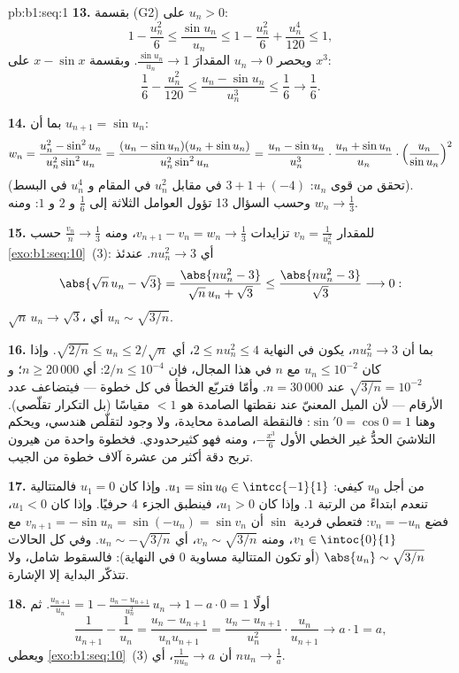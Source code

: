 \begin{solution}{pb:b1:seq:1}
\textbf{13.} بقسمة (G2) على $u_n > 0$:
\[
1 - \frac{u_n^2}{6} \leq \frac{\sin u_n}{u_n} \leq 1 -
\frac{u_n^2}{6} + \frac{u_n^4}{120} \leq 1 ,
\]
ويحصر $u_n \to 0$ المقدارَ $\frac{\sin u_n}{u_n} \to 1$. وبقسمة
$x - \sin x$ على $x^3$:
\[
\frac16 - \frac{u_n^2}{120} \leq \frac{u_n - \sin u_n}{u_n^3}
\leq \frac16 \longrightarrow \frac16 .
\]

\textbf{14.} بما أن $u_{n+1} = \sin u_n$:
\[
w_n = \frac{u_n^2 - \sin^2 u_n}{u_n^2 \sin^2 u_n}
= \frac{(u_n - \sin u_n)(u_n + \sin u_n)}{u_n^2 \sin^2 u_n}
= \frac{u_n - \sin u_n}{u_n^3}\cdot
\frac{u_n + \sin u_n}{u_n}\cdot
\Bigl(\frac{u_n}{\sin u_n}\Bigr)^{2}
\]
(تحقق من قوى $u_n$: $3 + 1 + (-4)$ في مقابل $u_n^2$
في المقام و $u_n^4$ في البسط). وحسب السؤال 13 تؤول العوامل
الثلاثة إلى $\frac16$ و $2$ و $1$: ومنه $w_n \to \frac13$.

\textbf{15.} للمقدار $v_n = \frac{1}{u_n^2}$ تزايدات $v_{n+1} -
v_n = w_n \to \frac13$، ومنه $\frac{v_n}{n} \to \frac13$ حسب
\cref{exo:b1:seq:10}~(3): أي $n u_n^2 \to 3$. عندئذ
\[
\abs{\sqrt n\,u_n - \sqrt 3}
= \frac{\abs{n u_n^2 - 3}}{\sqrt n\,u_n + \sqrt 3}
\leq \frac{\abs{n u_n^2 - 3}}{\sqrt 3} \longrightarrow 0 :
\]
$\sqrt n\,u_n \to \sqrt 3$، أي $u_n \sim \sqrt{3/n}$.

\textbf{16.} بما أن $n u_n^2 \to 3$، يكون في النهاية $2 \leq n u_n^2
\leq 4$، أي $\sqrt{2/n} \leq u_n \leq 2/\sqrt n$. وإذا كان $u_n
\leq 10^{-2}$ مع $n$ في هذا المجال، فإن $2/n \leq 10^{-4}$:
أي $n \geq 20\,000$؛ و $\sqrt{3/n} = 10^{-2}$ عند $n = 30\,000$.
وأمّا  فتربّع الخطأ في كل خطوة --- فيتضاعف
عدد الأرقام --- لأن الميل المعنيّ عند نقطتها الصامدة
هو $< 1$ مقياسًا (بل التكرار تقلّصي).
وهنا $\sin' 0 = \cos 0 = 1$: فالنقطة الصامدة محايدة، ولا وجود
لتقلّص هندسي، ويحكم التلاشيَ الحدُّ غير الخطي
الأول $-\frac{x^3}{6}$، ومنه فهو كثيرحدودي. فخطوة
واحدة من هيرون تربح دقة أكثر من عشرة آلاف خطوة من
الجيب.

\textbf{17.} من أجل $u_0$ كيفي: $u_1 = \sin u_0 \in
\intcc{-1}{1}$. وإذا كان $u_1 = 0$ فالمتتالية تنعدم ابتداءً من الرتبة
$1$. وإذا كان $u_1 > 0$، فينطبق الجزء 4 حرفيًا. وإذا كان $u_1 < 0$، فضع
$v_n = -u_n$: فتعطي فردية $\sin$ أن $v_{n+1} = -\sin u_n =
\sin(-u_n) = \sin v_n$ مع $v_1 \in \intoc{0}{1}$، ومنه $v_n \sim
\sqrt{3/n}$، أي $u_n \sim -\sqrt{3/n}$. وفي كل الحالات
$\abs{u_n} \sim \sqrt{3/n}$ (أو تكون المتتالية مساوية $0$ في النهاية):
فالسقوط شامل، ولا تتذكّر البداية إلا الإشارة.

\textbf{18.} أولًا $\frac{u_{n+1}}{u_n} = 1 - \frac{u_n -
u_{n+1}}{u_n^2}\,u_n \to 1 - a \cdot 0 = 1$. ثم
\[
\frac{1}{u_{n+1}} - \frac{1}{u_n}
= \frac{u_n - u_{n+1}}{u_n u_{n+1}}
= \frac{u_n - u_{n+1}}{u_n^2}\cdot\frac{u_n}{u_{n+1}}
\longrightarrow a \cdot 1 = a ,
\]
ويعطي \cref{exo:b1:seq:10}~(3) أن $\frac{1}{n u_n} \to a$،
أي $n u_n \to \frac1a$.


\end{solution}
